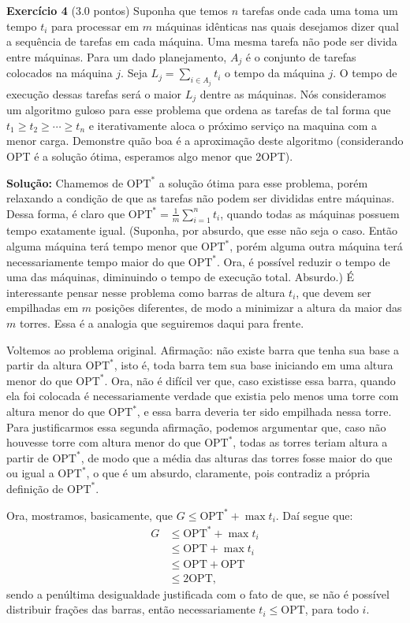 \noindent \textbf{Exercício 4} (3.0 pontos) Suponha que temos $n$ tarefas onde cada uma toma
um tempo $t_i$ para processar em $m$ máquinas idênticas nas quais desejamos
dizer qual a sequência de tarefas em cada máquina. Uma mesma tarefa
não pode ser divida entre máquinas. Para um dado planejamento,
$A_j$ é o conjunto de tarefas colocados na máquina $j$.
Seja $L_j = \sum_{i \in A_j} t_i$ o tempo da
máquina $j$. O tempo de execução dessas tarefas será o maior $L_j$ dentre as
máquinas.
Nós consideramos um algoritmo guloso para esse problema que ordena
as tarefas de tal forma que $t_1 \ge t_2 \ge \cdots \ge t_n$ e iterativamente aloca o
próximo serviço na maquina com a menor carga.
Demonstre quão boa é a aproximação deste algoritmo (considerando OPT
é a solução ótima, esperamos algo menor que 2OPT).

\bigskip

\noindent \textbf{Solução:}
Chamemos de $\text{OPT}^\ast$ a solução ótima para esse problema, porém relaxando a condição de que as tarefas não podem ser divididas entre máquinas. Dessa forma, é claro que $\text{OPT}^\ast = \frac{1}{m} \sum_{i = 1}^n t_i$, quando todas as máquinas possuem tempo exatamente igual. (Suponha, por absurdo, que esse não seja o caso. Então alguma máquina terá tempo menor que $\text{OPT}^\ast$, porém alguma outra máquina terá necessariamente tempo maior do que $\text{OPT}^\ast$. Ora, é possível reduzir o tempo de uma das máquinas, diminuindo o tempo de execução total. Absurdo.) É interessante pensar nesse problema como barras de altura $t_i$, que devem ser empilhadas em $m$ posições diferentes, de modo a minimizar a altura da maior das $m$ torres. Essa é a analogia que seguiremos daqui para frente.

Voltemos ao problema original. Afirmação: não existe barra que tenha sua base a partir da altura $\text{OPT}^\ast$, isto é, toda barra tem sua base iniciando em uma altura menor do que $\text{OPT}^\ast$. Ora, não é difícil ver que, caso existisse essa barra, quando ela foi colocada é necessariamente verdade que existia pelo menos uma torre com altura menor do que $\text{OPT}^\ast$, e essa barra deveria ter sido empilhada nessa torre. Para justificarmos essa segunda afirmação, podemos argumentar que, caso não houvesse torre com altura menor do que $\text{OPT}^\ast$, todas as torres teriam altura a partir de $\text{OPT}^\ast$, de modo que a média das alturas das torres fosse maior do que ou igual a $\text{OPT}^\ast$, o que é um absurdo, claramente, pois contradiz a própria definição de $\text{OPT}^\ast$.

Ora, mostramos, basicamente, que $G \le \text{OPT}^\ast + \max t_i$. Daí segue que:
\begin{align*}
    G &\le \text{OPT}^\ast + \max t_i \\
    &\le \text{OPT} + \max t_i \\
    &\le \text{OPT} + \text{OPT} \\
    &\le 2\text{OPT},
\end{align*}
sendo a penúltima desigualdade justificada com o fato de que, se não é possível distribuir frações das barras, então necessariamente $t_i \le \text{OPT}$, para todo $i$.

